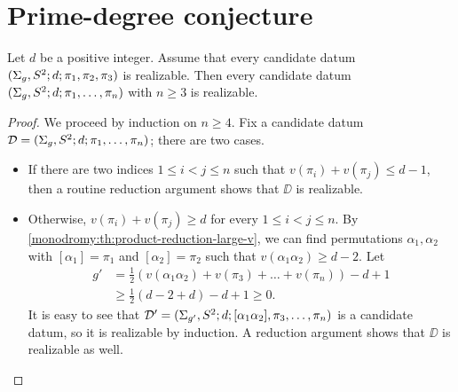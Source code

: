 \section{Prime-degree conjecture}
\begin{proposition}
Let $d$ be a positive integer. Assume that every candidate datum $(\Sigma_{g},S^2{};d;\pi_1,\pi_2,\pi_3)$ is realizable. Then every candidate datum $(\Sigma_{g},S^2{};d;\pi_1,\ldots,\pi_n)$ with $n\ge 3$ is realizable.
\end{proposition}
\begin{proof}
We proceed by induction on $n\ge 4$. Fix a candidate datum $\mathcal{D}=(\Sigma_{g},S^2{};d;\pi_1,\ldots,\pi_{n})$; there are two cases.
\begin{itemize}
\item If there are two indices $1\le i<j\le n$ such that $v(\pi_i)+v(\pi_j)\le d-1$, then a routine reduction argument shows that $\DD$ is realizable.
\item Otherwise, $v(\pi_i)+v(\pi_j)\ge d$ for every $1\le i<j\le n$. By \cref{monodromy:th:product-reduction-large-v}, we can find permutations $\alpha_1,\alpha_2$ with $[\alpha_1]=\pi_1$ and $[\alpha_2]=\pi_2$ such that $v(\alpha_1\alpha_2)\ge d-2$. Let
\begin{align*}
g'&=\frac{1}{2}(v(\alpha_1\alpha_2)+v(\pi_3)+\ldots+v(\pi_n))-d+1\\
&\ge\frac{1}{2}(d-2+d)-d+1\ge 0.
\end{align*}
It is easy to see that $\mathcal{D}'=(\Sigma_{g'},S^2{};d;[\alpha_1\alpha_2],\pi_3,\ldots,\pi_n)$ is a candidate datum, so it is realizable by induction. A reduction argument shows that $\DD$ is realizable as well.\qedhere
\end{itemize}
\end{proof}